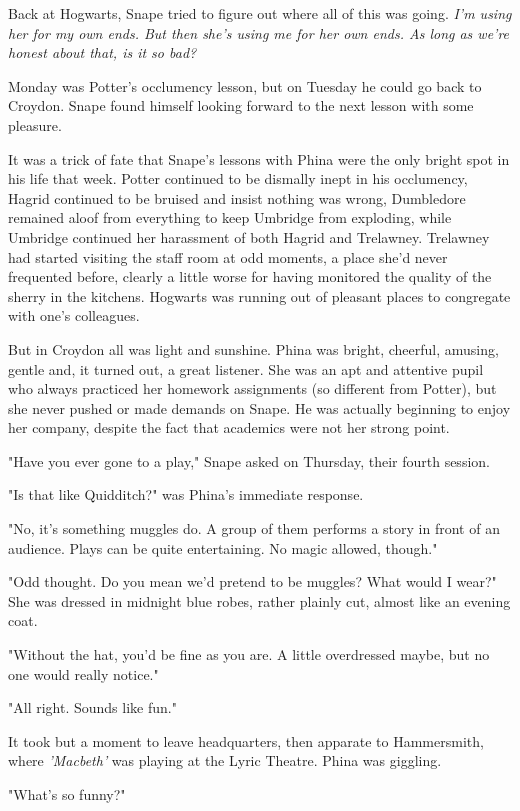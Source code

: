\documentclass[a4paper,11pt]{article}
\begin{document}
Back at Hogwarts, Snape tried to figure out where all of this was going. \emph{I'm using her for my own ends. But then she's using me for her own ends. As long as we're honest about that, is it so bad?}

Monday was Potter's occlumency lesson, but on Tuesday he could go back to Croydon. Snape found himself looking forward to the next lesson with some pleasure.

It was a trick of fate that Snape's lessons with Phina were the only bright spot in his life that week. Potter continued to be dismally inept in his occlumency, Hagrid continued to be bruised and insist nothing was wrong, Dumbledore remained aloof from everything to keep Umbridge from exploding, while Umbridge continued her harassment of both Hagrid and Trelawney. Trelawney had started visiting the staff room at odd moments, a place she'd never frequented before, clearly a little worse for having monitored the quality of the sherry in the kitchens. Hogwarts was running out of pleasant places to congregate with one's colleagues.

But in Croydon all was light and sunshine. Phina was bright, cheerful, amusing, gentle and, it turned out, a great listener. She was an apt and attentive pupil who always practiced her homework assignments (so different from Potter), but she never pushed or made demands on Snape. He was actually beginning to enjoy her company, despite the fact that academics were not her strong point.

"Have you ever gone to a play," Snape asked on Thursday, their fourth session.

"Is that like Quidditch?" was Phina's immediate response.

"No, it's something muggles do. A group of them performs a story in front of an audience. Plays can be quite entertaining. No magic allowed, though."

"Odd thought. Do you mean we'd pretend to be muggles? What would I wear?" She was dressed in midnight blue robes, rather plainly cut, almost like an evening coat.

"Without the hat, you'd be fine as you are. A little overdressed maybe, but no one would really notice."

"All right. Sounds like fun."

It took but a moment to leave headquarters, then apparate to Hammersmith, where \emph{'Macbeth'} was playing at the Lyric Theatre. Phina was giggling.

"What's so funny?"
\end{document}
